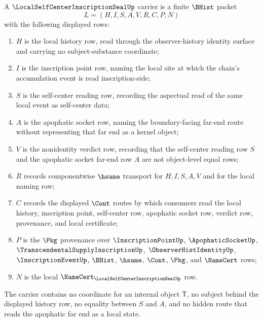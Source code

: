 \begin{definition}
\label{def:local-self-center-inscription-seal-carrier}
A $\LocalSelfCenterInscriptionSealUp$ carrier is a finite $\BHist$ packet
$$
L=(H,I,S,A,V,R,C,P,N)
$$
with the following displayed rows:
\begin{enumerate}
\item $H$ is the local history row, read through the observer-history identity surface and carrying no subject-substance coordinate;
\item $I$ is the inscription point row, naming the local site at which the chain's accumulation event is read inscription-side;
\item $S$ is the self-center reading row, recording the aspectual read of the same local event as self-center data;
\item $A$ is the apophatic socket row, naming the boundary-facing far-end route without representing that far end as a kernel object;
\item $V$ is the nonidentity verdict row, recording that the self-center reading row $S$ and the apophatic socket far-end row $A$ are not object-level equal rows;
\item $R$ records componentwise $\hsame$ transport for $H,I,S,A,V$ and for the local naming row;
\item $C$ records the displayed $\Cont$ routes by which consumers read the local history, inscription point, self-center row, apophatic socket row, verdict row, provenance, and local certificate;
\item $P$ is the $\Pkg$ provenance over $\InscriptionPointUp$, $\ApophaticSocketUp$, $\TranscendentalSupplyInscriptionUp$, $\ObserverHistIdentityUp$, $\InscriptionEventUp$, $\BHist$, $\hsame$, $\Cont$, $\Pkg$, and $\NameCert$ rows;
\item $N$ is the local $\NameCert_{\LocalSelfCenterInscriptionSealUp}$ row.
\end{enumerate}
The carrier contains no coordinate for an internal object $\mathsf{T}$, no subject behind the displayed history row, no equality between $S$ and $A$, and no hidden route that reads the apophatic far end as a local state.
\end{definition}


